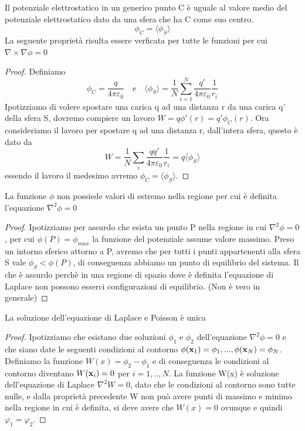 \begin{prop}
	Il potenziale elettrostatico in un generico punto C \`e uguale al valore medio del potenziale elettrostatico dato da una sfera che ha C come suo centro.
	\begin{equation*}
		\phi_C = \langle \phi_S \rangle 
	\end{equation*}
La seguente propriet\`a risulta essere verficata per tutte le funzioni per cui $\nabla \times \nabla\phi = 0$
\end{prop}
\begin{proof}
	Definiamo 
	\begin{equation*}
		\phi_C = \frac{q}{4\pi\varepsilon_0} \quad \text{e} \quad \langle \phi_S \rangle = \frac{1}{N} \sum_{i=1}^{N} \frac{q'}{4 \pi \varepsilon_0} \frac{1}{r_i} 
	\end{equation*}
Ipotizziamo di volere spostare una carica q ad una distanza r da una carica q' della sfera S, dovremo compiere un lavoro  $W = q \phi'(r) = q'\phi_C(r)$. Ora consideriamo il lavoro per spostare q ad una distanza r, dall'intera sfera, questo \`e dato da 
\begin{equation*}
	W = \frac{1}{N} \sum_{i} \frac{qq'}{4 \pi \varepsilon_0} \frac{1}{r_i} = q \langle \phi_S \rangle 
\end{equation*}
essendo il lavoro il medesimo avremo $\phi_C = \langle \phi_S \rangle $.

\end{proof}
\begin{prop}
	La funzione $\phi$ non possiede valori di estremo nella regione per cui \`e definita l'equazione $\nabla^2 \phi = 0$
\end{prop}
\begin{proof}
	Ipotizziamo per assurdo che esista un punto P nella regione in cui $\nabla^2 \phi = 0$, per cui $\phi(P) = \phi_{max}$ la funzione del potenziale assume valore massimo. Preso un intorno sferico attorno a P, avremo che per tutti i punti appartenenti alla sfera S vale $\phi_S < \phi(P)$, di conseguenza abbiamo un punto di equilibrio del sistema. Il che \`e assurdo perch\`e in una regione di spazio dove \`e definita l'equazione di Laplace non possono esserci configurazioni di equilibrio. (Non \`e vero in generale)
	 
\end{proof}
\begin{prop}
	La  soluzione dell'equazione di Laplace e Poisson \`e unica
\end{prop}
\begin{proof}
	Ipotizziamo che esistano due soluzioni $\phi_1$ e $\phi_2$ dell'equazione $\nabla^2 \phi = 0$ e che siano date le seguenti condizioni al contorno $\phi(\bold{x}_1) = \phi_1,..., \phi(\bold{x}_N) = \phi_N$. Definiamo la funzione $W(x) = \phi_2 - \phi_1$ e di conseguenza le condizioni al contorno diventano $W(\bold{x}_i) = 0$ per $i = 1,..,N$. La funzione W(x) \`e soluzione dell'equazione di Laplace $\nabla^2 W =0$, dato che le condizioni al contorno sono tutte nulle, e dalla propriet\`a precedente W non pu\`o avere punti di massimo e minimo nella regione in cui \`e definita, si deve avere che $W(x) =0 $ ovunque e quindi $\varphi_1	 = \varphi_2$.
	 
\end{proof}


